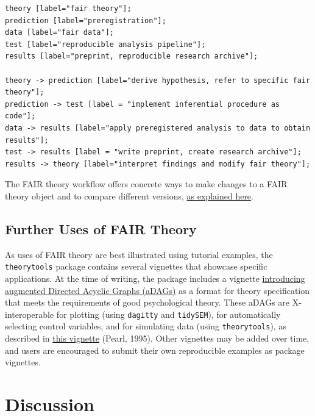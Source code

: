 \documentclass[man]{apa7}
\begin{document}
\begin{verbatim}
theory [label="fair theory"];
prediction [label="preregistration"];
data [label="fair data"];
test [label="reproducible analysis pipeline"];
results [label="preprint, reproducible research archive"];

theory -> prediction [label="derive hypothesis, refer to specific fair theory"];
prediction -> test [label = "implement inferential procedure as code"];
data -> results [label="apply preregistered analysis to data to obtain results"];
test -> results [label = "write preprint, create research archive"];
results -> theory [label="interpret findings and modify fair theory"];
\end{verbatim}

The FAIR theory workflow offers concrete ways to make changes to a FAIR theory object and to compare different versions, \href{https://cjvanlissa.github.io/theorytools/articles/updating_theory.html}{as explained here}.

\subsection{Further Uses of FAIR Theory}\label{further-uses-of-fair-theory}

As uses of FAIR theory are best illustrated using tutorial examples,
the \texttt{theorytools} package contains several vignettes that showcase specific applications.
At the time of writing, the package includes a
vignette \href{https://cjvanlissa.github.io/theorytools/articles/augmented_dags.html}{introducing augmented Directed Acyclic Graphs (aDAGs)} as a format for theory specification that meets the requirements of good psychological theory.
These aDAGs are X-interoperable for plotting (using \texttt{dagitty} and \texttt{tidySEM}),
for automatically selecting control variables, and for simulating data (using \texttt{theorytools}),
as described in \href{https://cjvanlissa.github.io/theorytools/articles/causal-inference.html}{this vignette} (Pearl, 1995).
Other vignettes may be added over time, and users are encouraged to submit their own reproducible examples as package vignettes.

\section{Discussion}\label{discussion}
\end{document}
